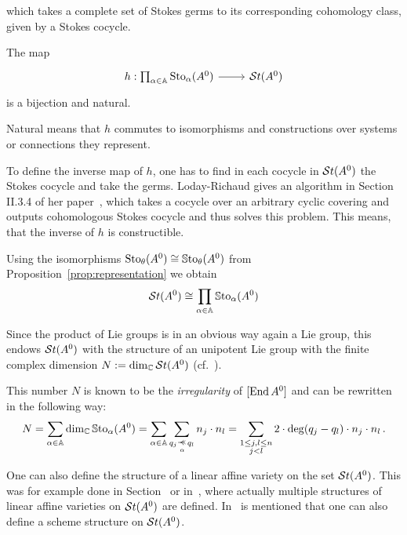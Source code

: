 which takes a complete set of Stokes germs to its corresponding cohomology
class, given by a Stokes cocycle.
\begin{center}
  \begin{minipage}[t]{0.8\textwidth}
    \begin{tthm}\label{thm:mainThm2}
      The map
      \[ \begin{tikzcd}
          h:\prod_{\alpha\in\A}\Sto_\alpha(A^0) \rar& \St(A^0)
      \end{tikzcd} \]
      is a bijection and natural.
      \begin{s-rem}
        Natural means that $h$ commutes to isomorphisms and constructions over
        systems or connections they represent.
      \end{s-rem}
    \end{tthm}
  \end{minipage}
\end{center}
To define the inverse map of $h$, one has to find in each cocycle in $\mathcal{S}{}t(A^0)$
the Stokes cocycle and take the germs. Loday-Richaud gives an algorithm in
Section II.3.4 of her paper~\cite{Loday1994}, which takes a cocycle over an
arbitrary cyclic covering and outputs cohomologous Stokes cocycle and thus
solves this problem. This means, that the inverse of $h$ is constructible.

\begin{cor}
  \BIGPROBLEM[remove?]
  Using the isomorphisms $\operatorname{Sto}_\theta(A^0)\cong\operatorname{\mathbb{S}to}_\theta(A^0)$ from
  Proposition~\ref{prop:representation} we obtain
  \[
    \mathcal{S}{}t(A^0)\cong\prod_{\alpha\in\mathbb{A}}\operatorname{\mathbb{S}to}_\alpha(A^0)
  \]
\end{cor}
Since the product of Lie groups is in an obvious way again a Lie group, this
endows $\mathcal{S}{}t(A^0)$ with the structure of an unipotent Lie group with the
finite complex dimension $N:=\dim_\mathbb{C}\mathcal{S}{}t(A^0)$
(cf.~\cite[Sec.III.1]{Loday1994}).
\begin{rem}
  This number $N$ is known to be the \emph{irregularity} of $[\operatorname{End} A^0]$ and
  can be rewritten in the following way:
  \[
    N=\sum_{\alpha\in\A}\dim_\C\SSto_\alpha(A^0)
     =\sum_{\alpha\in\A}\sum_{q_j\myrel{\alpha}q_l}n_j\cdot n_l
     =\sum_{\substack{1\leq j,l\leq n\\j<l}}2\cdot\deg(q_j-q_l)\cdot
       n_j\cdot n_l \,.
  \]
\end{rem}

One can also define the structure of a linear affine variety on the set
$\mathcal{S}{}t(A^0)$. This was for example done in
Section~\cite[Sec.II.3]{babbitt1989local} or in~\cite[Sec.III.1]{Loday1994}, where
actually multiple structures of linear affine varieties on $\mathcal{S}{}t(A^0)$ are
defined. In~\cite[35ff]{Varadarajan96linearmeromorphic} is mentioned that one
can also define a scheme structure on $\mathcal{S}{}t(A^0)$.

